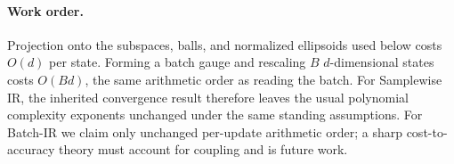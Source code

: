 \paragraph{Work order.}
Projection onto the subspaces, balls, and normalized ellipsoids used below costs $O(d)$ per state. Forming a batch gauge and rescaling $B$ $d$-dimensional states costs $O(Bd)$, the same arithmetic order as reading the batch. For Samplewise IR, the inherited convergence result therefore leaves the usual polynomial complexity exponents unchanged under the same standing assumptions. For Batch-IR we claim only unchanged per-update arithmetic order; a sharp cost-to-accuracy theory must account for coupling and is future work.

